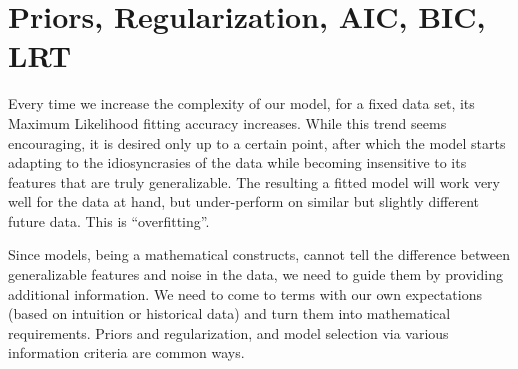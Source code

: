 \newpage
\section{Priors, Regularization, AIC, BIC, LRT}

Every time we increase the complexity of our model, for a fixed data set, its Maximum Likelihood fitting accuracy increases. While this trend seems encouraging, it is desired only up to a certain point, after which the model starts adapting to the idiosyncrasies of the data while becoming insensitive to its features that are truly generalizable. The resulting a fitted model will work very well for the data at hand, but under-perform on similar but slightly different future data. This is ``overfitting''.

Since models, being a mathematical constructs, cannot tell the difference between generalizable features and noise in the data, we need to guide them by providing additional information. We need to come to terms with our own expectations (based on intuition or historical data) and turn them into mathematical requirements. Priors and regularization, and model selection via various information criteria are common ways.



